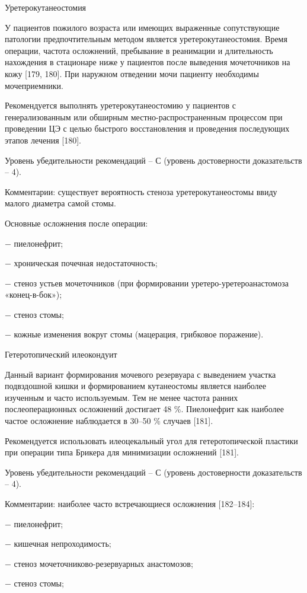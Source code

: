 Уретерокутанеостомия

У пациентов пожилого возраста или имеющих выраженные сопутствующие патологии предпочтительным методом является уретерокутанеостомия. Время операции, частота осложнений, пребывание в реанимации и длительность нахождения в стационаре ниже у пациентов после выведения мочеточников на кожу [179, 180]. При наружном отведении мочи пациенту необходимы мочеприемники.

Рекомендуется выполнять уретерокутанеостомию у пациентов с генерализованным или обширным местно-распространенным процессом при проведении ЦЭ с целью быстрого восстановления и проведения последующих этапов лечения [180].

Уровень убедительности рекомендаций – С (уровень достоверности доказательств – 4).

Комментарии: существует вероятность стеноза уретерокутанеостомы ввиду малого диаметра самой стомы.

Основные осложнения после операции:

− пиелонефрит;

− хроническая почечная недостаточность;

− стеноз устьев мочеточников (при формировании уретеро-уретероанастомоза «конец-в-бок»);

− стеноз стомы;

− кожные изменения вокруг стомы (мацерация, грибковое поражение).

Гетеротопический илеокондуит

Данный вариант формирования мочевого резервуара с выведением участка подвздошной кишки и формированием кутанеостомы является наиболее изученным и часто используемым. Тем не менее частота ранних послеоперационных осложнений достигает 48 \%. Пиелонефрит как наиболее частое осложнение наблюдается в 30–50 \% случаев [181].

Рекомендуется использовать илеоцекальный угол для гетеротопической пластики при операции типа Брикера для минимизации осложнений [181].

Уровень убедительности рекомендаций – С (уровень достоверности доказательств – 4).

Комментарии: наиболее часто встречающиеся осложнения [182–184]: 

− пиелонефрит;

− кишечная непроходимость;

− стеноз мочеточниково-резервуарных анастомозов;

− стеноз стомы;

